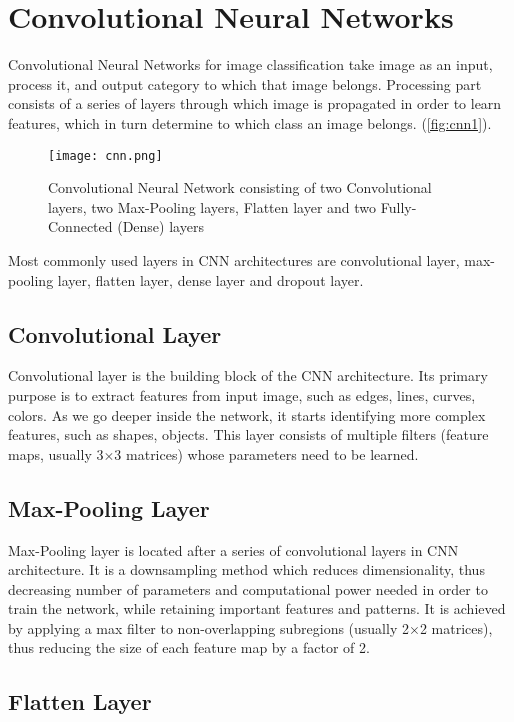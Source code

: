 \chapter{Convolutional Neural Networks}
\label{appx:simulation}

Convolutional Neural Networks for image classification \cite{krizhevsky2012imagenet} take image as an input, process it, and output category to which that image belongs. Processing part consists of a series of layers through which image is propagated in order to learn features, which in turn determine to which class an image belongs. (\textcolor{red}{\autoref{fig:cnn1}}).

\begin{figure}[h]
	\centering
	\texttt{[image: cnn.png]}
	\caption{Convolutional Neural Network consisting of two Convolutional layers, two Max-Pooling layers, Flatten layer and two Fully-Connected (Dense) layers}
	\label{fig:cnn1}
\end{figure}

Most commonly used layers in CNN architectures are convolutional layer, max-pooling layer, flatten layer, dense layer and dropout layer.

\section{Convolutional Layer}

Convolutional layer is the building block of the CNN architecture. Its primary purpose is to extract features from input image, such as edges, lines, curves, colors. As we go deeper inside the network, it starts identifying more complex features, such as shapes, objects. This layer consists of multiple filters (feature maps, usually 3$\times$3 matrices) whose parameters need to be learned.
\section{Max-Pooling Layer}

Max-Pooling layer is located after a series of convolutional layers in CNN architecture. It is a downsampling method which reduces dimensionality, thus decreasing number of parameters and computational power needed in order to train the network, while retaining important features and patterns. It is achieved by applying a max filter to non-overlapping subregions (usually 2$\times$2 matrices), thus reducing the size of each feature map by a factor of 2.

\section{Flatten Layer}

